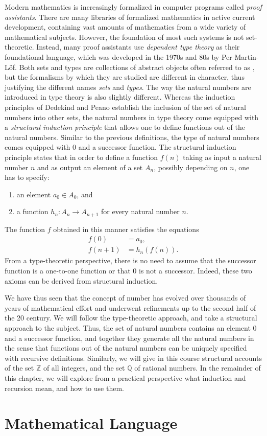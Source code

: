 Modern mathematics is increasingly formalized in computer programs called \emph{proof assistants}. There are many libraries of formalized mathematics in active current development, containing vast amounts of mathematics from a wide variety of mathematical subjects. However, the foundation of most such systems is not set-theoretic. Instead, many proof assistants use \emph{dependent type theory} as their foundational language, which was developed in the 1970s and 80s by Per Martin-L\"of. Both sets and types are collections of abstract objects often referred to as , but the formalisms by which they are studied are different in character, thus justifying the different names \emph{sets} and \emph{types}. The way the natural numbers are introduced in type theory is also slightly different. Whereas the induction principles of Dedekind and Peano establish the inclusion of the set of natural numbers into other sets, the natural numbers in type theory come equipped with a \emph{structural induction principle} that allows one to define functions out of the natural numbers. Similar to the previous definitions, the type of natural numbers comes equipped with $0$ and a successor function. The structural induction principle states that in order to define a function $f(n)$ taking as input a natural number $n$ and as output an element of a set $A_n$, possibly depending on $n$, one has to specify:
\begin{enumerate}
\item an element $a_0\in A_0$, and
\item a function $h_n: A_n\to A_{n+1}$ for every natural number $n$.
\end{enumerate}
The function $f$ obtained in this manner satisfies the equations
\begin{align*}
  f(0) & = a_0, \\
  f(n+1) & = h_n(f(n)).
\end{align*}
From a type-theoretic perspective, there is no need to assume that the successor function is a one-to-one function or that $0$ is not a successor. Indeed, these two axioms can be derived from structural induction.

We have thus seen that the concept of number has evolved over thousands of years of mathematical effort and underwent refinements up to the second half of the 20\supth{} century. We will follow the type-theoretic approach, and take a structural approach to the subject. Thus, the set of natural numbers contains an element $0$ and a successor function, and together they generate all the natural numbers in the sense that functions out of the natural numbers can be uniquely specified with recursive definitions. Similarly, we will give in this course structural accounts of the set $\mathbb{Z}$ of all integers, and the set $\mathbb{Q}$ of rational numbers. In the remainder of this chapter, we will explore from a practical perspective what induction and recursion mean, and how to use them.

\section{Mathematical Language}


